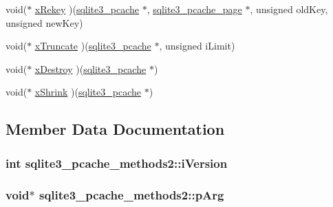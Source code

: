 \begin{CompactItemize}
\item 
void($\ast$ \hyperlink{structsqlite3__pcache__methods2_28a22927b108182e22025bbe6ba1f68e}{xRekey} )(\hyperlink{sqlite3_8h_096c453d937d51f7926d7d31c8e0bd2f}{sqlite3\_\-pcache} $\ast$, \hyperlink{structsqlite3__pcache__page}{sqlite3\_\-pcache\_\-page} $\ast$, unsigned oldKey, unsigned newKey)
\item 
void($\ast$ \hyperlink{structsqlite3__pcache__methods2_7c565709ab91dbe7feb5b82c684ba604}{xTruncate} )(\hyperlink{sqlite3_8h_096c453d937d51f7926d7d31c8e0bd2f}{sqlite3\_\-pcache} $\ast$, unsigned iLimit)
\item 
void($\ast$ \hyperlink{structsqlite3__pcache__methods2_144d6e899889e80e00f93fb6c83359e2}{xDestroy} )(\hyperlink{sqlite3_8h_096c453d937d51f7926d7d31c8e0bd2f}{sqlite3\_\-pcache} $\ast$)
\item 
void($\ast$ \hyperlink{structsqlite3__pcache__methods2_f00c121e9c39b1df292711013c226ba5}{xShrink} )(\hyperlink{sqlite3_8h_096c453d937d51f7926d7d31c8e0bd2f}{sqlite3\_\-pcache} $\ast$)
\end{CompactItemize}


\subsection{Member Data Documentation}
\hypertarget{structsqlite3__pcache__methods2_03b27be6c7cb8f1d2662c454cbe58483}{
\subsubsection[iVersion]{\setlength{\rightskip}{0pt plus 5cm}int {\bf sqlite3\_\-pcache\_\-methods2::iVersion}}}
\label{structsqlite3__pcache__methods2_03b27be6c7cb8f1d2662c454cbe58483}


\hypertarget{structsqlite3__pcache__methods2_ee83131f16bb88218d7b0339854719d6}{
\subsubsection[pArg]{\setlength{\rightskip}{0pt plus 5cm}void$\ast$ {\bf sqlite3\_\-pcache\_\-methods2::pArg}}}
\label{structsqlite3__pcache__methods2_ee83131f16bb88218d7b0339854719d6}


